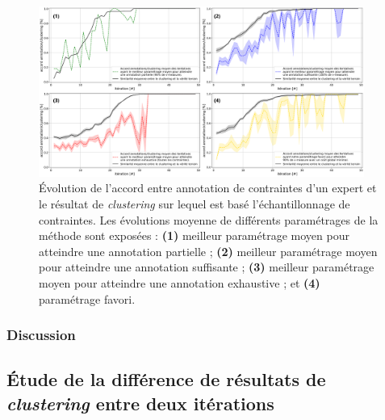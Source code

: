 			
			\begin{figure}[!htb]
				\centering
				\includegraphics[width=0.95\textwidth]{figures/etude-rentabilite-accord-annotation}
				\caption{Évolution de l'accord entre annotation de contraintes d'un expert et le résultat de \textit{clustering} sur lequel est basé l'échantillonnage de contraintes.
				Les évolutions moyenne de différents paramétrages de la méthode sont exposées :
				\textbf{(1)} meilleur paramétrage moyen pour atteindre une annotation partielle ;
				\textbf{(2)} meilleur paramétrage moyen pour atteindre une annotation suffisante ;
				\textbf{(3)} meilleur paramétrage moyen pour atteindre une annotation exhaustive ;
				et \textbf{(4)} paramétrage favori.
				} 
				\label{figure:4.5.1-ETUDE-RENTABILITE-ACCORD-ANNOTATION-CLUSTERING}
			\end{figure}

		\subsubsection{Discussion}
		
			
	
	
	
	\subsection{Étude de la différence de résultats de \textit{clustering} entre deux itérations}
	\label{section:4.5.2-ETUDE-RENTABILITE-SIMILARITE-CLUSTERING}
		
